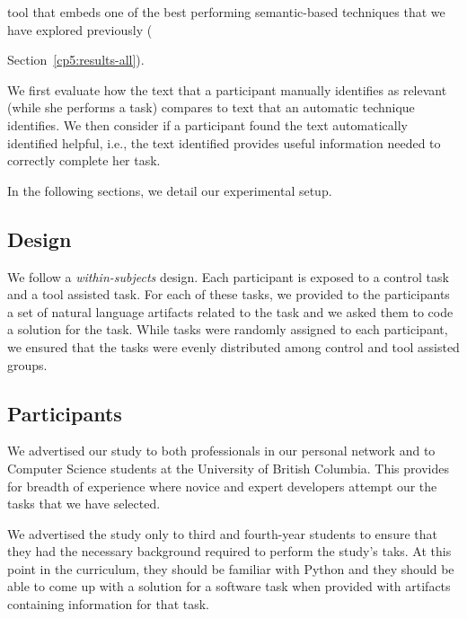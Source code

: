  tool that embeds one of the best performing semantic-based techniques that we have explored previously ({Section~\ref{cp5:results-all}). 


We first evaluate how the text that a participant manually identifies as relevant (while she performs a task) 
compares to text that an automatic technique identifies. 
We then consider if a participant found the text automatically identified helpful, i.e., the text identified provides useful information needed to correctly complete her task.


In the following sections, we detail our experimental setup.








\subsection{Design}


We follow a \textit{within-subjects} design. Each participant is exposed to a control task and a tool assisted task. For each of these tasks, we provided to the participants a set of natural language artifacts related to the task
and we asked them to code a solution for the task. While tasks were randomly assigned to each participant, 
we ensured that the tasks were evenly distributed among control and tool assisted groups. 






\subsection{Participants}



We advertised our study to both professionals in our personal network and to Computer Science students at the University of British Columbia. 
This provides for breadth of experience where novice and expert developers attempt our the tasks that we have selected. 


We advertised the study only to third and fourth-year students to ensure that they had the necessary background required to perform the study's taks.
At this point in the curriculum, they should be familiar with Python and they should be able to come up with a solution 
for a software task when provided with artifacts containing information for that task.


}
